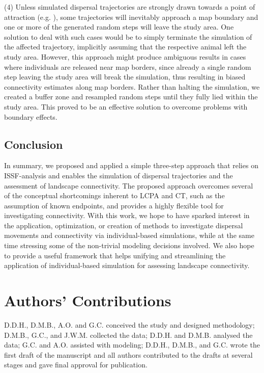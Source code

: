 \documentclass[abstract=on,10pt,a4paper,bibliography=totocnumbered]{article}
\begin{document}
(4) Unless simulated dispersal trajectories are strongly drawn towards a point
of attraction (e.g. \cite{Signer.2017}), some trajectories will inevitably
approach a map boundary and one or more of the generated random steps will leave
the study area. One solution to deal with such cases would be to simply
terminate the simulation of the affected trajectory, implicitly assuming that
the respective animal left the study area. However, this approach might produce
ambiguous results in cases where individuals are released near map borders,
since already a single random step leaving the study area will break the
simulation, thus resulting in biased connectivity estimates along map borders.
Rather than halting the simulation, we created a buffer zone \citep{Koen.2010}
and resampled random steps until they fully lied within the study area. This
proved to be an effective solution to overcome problems with boundary effects.

\subsection{Conclusion}
In summary, we proposed and applied a simple three-step approach that relies on
ISSF-analysis and enables the simulation of dispersal trajectories and the
assessment of landscape connectivity. The proposed approach overcomes several of
the conceptual shortcomings inherent to LCPA and CT, such as the assumption of
known endpoints, and provides a highly flexible tool for investigating
connectivity. With this work, we hope to have sparked interest in the
application, optimization, or creation of methods to investigate dispersal
movements and connectivity via individual-based simulations, while at the same
time stressing some of the non-trivial modeling decisions involved. We also hope
to provide a useful framework that helps unifying and streamlining the
application of individual-based simulation for assessing landscape connectivity.

\section{Authors' Contributions}
D.D.H., D.M.B., A.O. and G.C. conceived the study and designed methodology;
D.M.B., G.C., and J.W.M. collected the data; D.D.H. and D.M.B. analysed the
data; G.C. and A.O. assisted with modeling; D.D.H., D.M.B., and G.C. wrote the
first draft of the manuscript and all authors contributed to the drafts at
several stages and gave final approval for publication.
\end{document}

